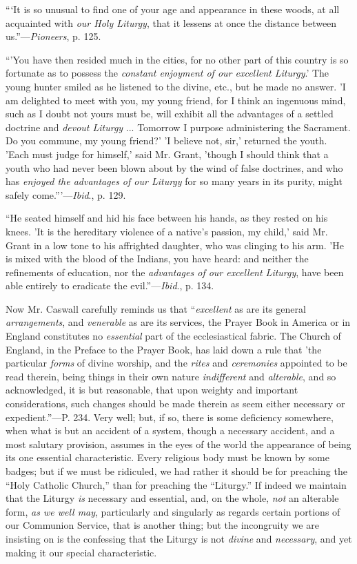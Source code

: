 ``‘It
is so unusual to find one of your age and appearance in these woods,
at all acquainted with \emph{our Holy Liturgy}, that it lessens at
once the distance between us.''—\emph{Pioneers}, p. 125.

``'You
have then resided much in the cities, for no other part of this
country is so fortunate as to possess the \emph{constant enjoyment of our
excellent Liturgy}.' The young hunter smiled as he listened to the
divine, etc., but he made no answer. 'I am delighted to meet with you,
my young friend, for I think an ingenuous mind, such as I doubt not
yours must be, will exhibit all the advantages of a settled doctrine
and \emph{devout Liturgy} ... Tomorrow I purpose administering the
Sacrament. Do you commune, my young friend?' 'I believe not, sir,'
returned the youth. 'Each must judge for himself,' said Mr. Grant,
'though I should think that a youth who had never been blown about by
the wind of false doctrines, and who has \emph{enjoyed the advantages of
our Liturgy} for so many years in its purity, might safely come.'''—\emph{Ibid}.,
p. 129.

``He
seated himself and hid his face between his hands, as they rested on
his knees. 'It is the hereditary violence of a native's passion, my
child,' said Mr. Grant in a low tone to his affrighted daughter, who
was clinging to his arm. 'He is mixed with the blood of the Indians,
you have heard: and neither the refinements of education, nor the \emph{advantages
of our excellent Liturgy}, have been able entirely to eradicate the
evil.''—\emph{Ibid}., p. 134.

Now Mr. Caswall carefully reminds us that ``\emph{excellent}
as are its general \emph{arrangements}, and \emph{venerable} as are
its services, the Prayer Book in America or in England constitutes no \emph{essential}
part of the ecclesiastical fabric. The Church of England, in the
Preface to the Prayer Book, has laid down a rule that 'the particular \emph{forms}
of divine worship, and the \emph{rites} and \emph{ceremonies}
appointed to be read therein, being things in their own nature \emph{indifferent}
and \emph{alterable}, and so acknowledged, it is but reasonable, that
upon weighty and important considerations, such changes should be made
therein as seem either necessary or expedient.''—P. 234. Very well;
but, if so, there is some deficiency somewhere, when what is but an
accident of a system, though a necessary accident, and a most
salutary provision, assumes in the eyes of the world the appearance of
being its one essential characteristic. Every religious body must be
known by some badges; but if we must be ridiculed, we had rather it
should be for preaching the ``Holy Catholic Church,'' than for preaching
the ``Liturgy.'' If indeed we maintain that the Liturgy \emph{is}
necessary and essential, and, on the whole, \emph{not} an alterable
form, \emph{as we well may}, particularly and singularly as regards
certain portions of our Communion Service, that is another thing; but
the incongruity we are insisting on is the confessing that the Liturgy
is not \emph{divine} and \emph{necessary}, and yet making it our
special characteristic.

